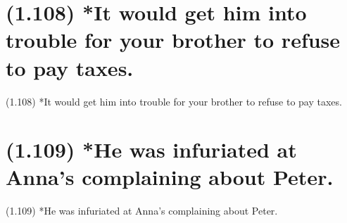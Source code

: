 \documentclass{article}
\begin{document}
\clearpage

%
%

\section*{(1.108) *It would get him into trouble for your brother to refuse to pay taxes.}

\bigbreak
\begin{enumerate*}
\item[(1.108)] *It would get him into trouble for your brother to refuse to pay taxes.
\end{enumerate*}
\bigbreak

\bigbreak
\begin{minipage}{\textwidth}
\end{minipage}
\bigbreak

\clearpage

%
%

\section*{(1.109) *He was infuriated at Anna's complaining about Peter.}

\bigbreak
\begin{enumerate*}
\item[(1.109)] *He was infuriated at Anna's complaining about Peter.
\end{enumerate*}
\bigbreak
\end{document}
